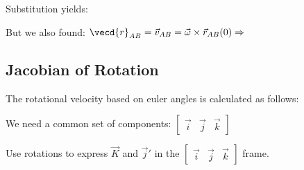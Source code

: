 \documentclass[10pt,a4paper]{scrartcl}
\begin{document}
\begin{multicols*}{2}
Substitution yields:




But we also found: $\vecd{r}_{AB}=\vec{v}_{AB}=\vec{\omega}\times\vec{r}_{AB}(0)\Rightarrow$


\subsection{Jacobian of Rotation}


The rotational velocity based on euler angles is calculated as follows:


We need a common set of components: $\begin{bmatrix}
\vec{i}&\vec{j}&\vec{k}
\end{bmatrix}$

Use rotations to express $\vec{K}$ and $\vec{j}'$ in the $\begin{bmatrix}
\vec{i}&\vec{j}&\vec{k}
\end{bmatrix}$ frame.



\end{multicols*}
\end{document}
